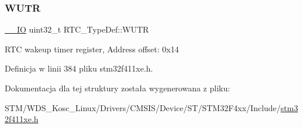 \subsubsection{\texorpdfstring{W\+U\+TR}{WUTR}}
{\footnotesize\ttfamily \hyperlink{core__sc300_8h_aec43007d9998a0a0e01faede4133d6be}{\+\_\+\+\_\+\+IO} uint32\+\_\+t R\+T\+C\+\_\+\+Type\+Def\+::\+W\+U\+TR}

R\+TC wakeup timer register, Address offset\+: 0x14 

Definicja w linii 384 pliku stm32f411xe.\+h.



Dokumentacja dla tej struktury została wygenerowana z pliku\+:\begin{DoxyCompactItemize}
\item 
S\+T\+M/\+W\+D\+S\+\_\+\+Kosc\+\_\+\+Linux/\+Drivers/\+C\+M\+S\+I\+S/\+Device/\+S\+T/\+S\+T\+M32\+F4xx/\+Include/\hyperlink{stm32f411xe_8h}{stm32f411xe.\+h}\end{DoxyCompactItemize}
